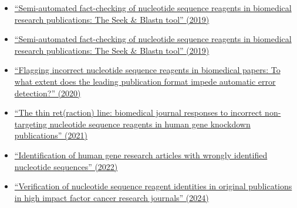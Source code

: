 \documentclass[letterpaper, 12pt]{article}
\begin{document}
\begin{itemize}
    \item \href{https://doi.org/10.1371/journal.pone.0213266}{``Semi-automated fact-checking of nucleotide sequence reagents in biomedical research publications: The Seek \& Blastn tool'' (2019)}
    \item \href{https://doi.org/10.1371/journal.pone.0213266}{``Semi-automated fact-checking of nucleotide sequence reagents in biomedical research publications: The Seek \& Blastn tool'' (2019)}
    \item \href{https://doi.org/10.1007/s11192-020-03463-z}{``Flagging incorrect nucleotide sequence reagents in biomedical papers: To what extent does the leading publication format impede automatic error detection?'' (2020)}
    \item \href{https://doi.org/10.1007/s11192-021-03871-9}{``The thin ret(raction) line: biomedical journal responses to incorrect non-targeting nucleotide sequence reagents in human gene knockdown publications'' (2021)}
    \item \href{https://doi.org/10.26508/lsa.202101203}{``Identification of human gene research articles with wrongly identified nucleotide sequences'' (2022)}
    \item \href{https://doi.org/10.1007/s00210-023-02846-2}{``Verification of nucleotide sequence reagent identities in original publications in high impact factor cancer research journals'' (2024)}
\end{itemize}
\end{document}
